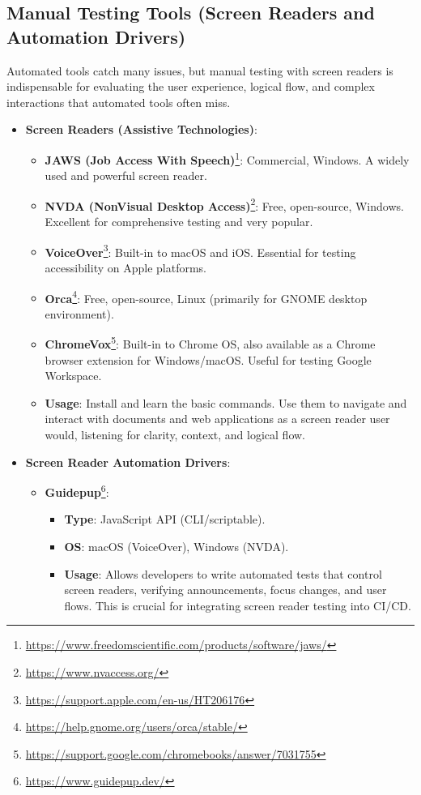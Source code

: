 \subsection{Manual Testing Tools (Screen Readers and Automation Drivers)}

Automated tools catch many issues, but manual testing with screen readers is indispensable for evaluating the user experience, logical flow, and complex interactions that automated tools often miss.

\begin{itemize}
    \item \textbf{Screen Readers (Assistive Technologies)}:
        \begin{itemize}
            \item \textbf{JAWS (Job Access With Speech)}\footnote{\url{https://www.freedomscientific.com/products/software/jaws/}}: Commercial, Windows. A widely used and powerful screen reader.
            \item \textbf{NVDA (NonVisual Desktop Access)}\footnote{\url{https://www.nvaccess.org/}}: Free, open-source, Windows. Excellent for comprehensive testing and very popular.
            \item \textbf{VoiceOver}\footnote{\url{https://support.apple.com/en-us/HT206176}}: Built-in to macOS and iOS. Essential for testing accessibility on Apple platforms.
            \item \textbf{Orca}\footnote{\url{https://help.gnome.org/users/orca/stable/}}: Free, open-source, Linux (primarily for GNOME desktop environment).
            \item \textbf{ChromeVox}\footnote{\url{https://support.google.com/chromebooks/answer/7031755}}: Built-in to Chrome OS, also available as a Chrome browser extension for Windows/macOS. Useful for testing Google Workspace.
            \item \textbf{Usage}: Install and learn the basic commands. Use them to navigate and interact with documents and web applications as a screen reader user would, listening for clarity, context, and logical flow.
        \end{itemize}
    \item \textbf{Screen Reader Automation Drivers}:
        \begin{itemize}
            \item \textbf{Guidepup}\footnote{\url{https://www.guidepup.dev/}}:
                \begin{itemize}
                    \item \textbf{Type}: JavaScript API (CLI/scriptable).
                    \item \textbf{OS}: macOS (VoiceOver), Windows (NVDA).
                    \item \textbf{Usage}: Allows developers to write automated tests that control screen readers, verifying announcements, focus changes, and user flows. This is crucial for integrating screen reader testing into CI/CD.
                \end{itemize}
        \end{itemize}
\end{itemize}

